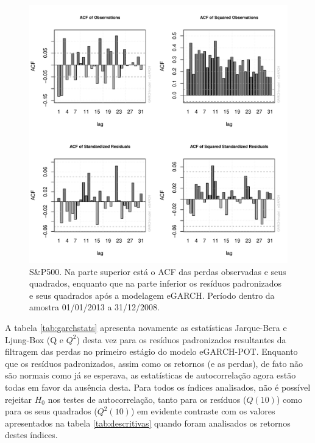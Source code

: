 \documentclass[review]{elsarticle}
\theoremstyle{definition}
\begin{document}
\begin{figure}[H]
	\centering
	\includegraphics[width=1\linewidth]{figs/artigo-acf-SP500}
	\caption{S\&P500. Na parte superior está o ACF das perdas observadas e seus quadrados, enquanto que na parte inferior os resíduos padronizados e seus quadrados após a modelagem eGARCH. Período dentro da amostra 01/01/2013 a 31/12/2008.}
	\label{fig:artigo-acf-sp500}
\end{figure}

A tabela \ref{tab:garchstats} apresenta novamente as estatísticas Jarque-Bera e Ljung-Box (Q e $Q^2$) desta vez para os resíduos padronizados resultantes da filtragem das perdas no primeiro estágio do modelo eGARCH-POT. Enquanto que os resíduos padronizados, assim como os retornos (e as perdas), de fato não são normais como já se esperava, as estatísticas de autocorrelação agora estão todas em favor da ausência desta. Para todos os índices analisados, não é possível rejeitar $H_0$ nos testes de autocorrelação, tanto para os resíduos ($Q(10)$) como para os seus quadrados ($Q^2(10)$) em evidente contraste com os valores apresentados na tabela \ref{tab:descritivas} quando foram analisados os retornos destes índices.



\end{document}
